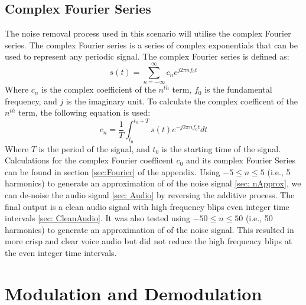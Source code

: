 \documentclass{article}
\begin{document}
\subsection{Complex Fourier Series}
The noise removal process used in this scenario will utilise the complex Fourier series. The complex Fourier series is a series of complex exponentials that can be used to represent any periodic signal. The complex Fourier series is defined as:
\begin{equation}
    s(t) = \sum_{n=-\infty}^{\infty} c_n e^{j2 \pi nf_{0}t}
\end{equation}
Where $c_n$ is the complex coefficient of the $n^{th}$ term, $f_{0}$ is the fundamental frequency, and $j$ is the imaginary unit. To calculate the complex coefficent of the $n^{th}$ term, the following equation is used:
\begin{equation}
    c_n = \frac{1}{T} \int_{t_{0}}^{t_{0}+T} s(t) e^{-j2 \pi nf_{0}t} dt
\end{equation}
Where $T$ is the period of the signal, and $t_{0}$ is the starting time of the signal. Calculations for the complex Fourier coefficent $c_{0}$ and its complex Fourier Series can be found in section \ref{sec:Fourier} of the appendix. Using $-5 \leq n \leq 5$ (i.e., 5 harmonics) to generate an approximation of of the noise signal \ref{sec: nApprox}, we can de-noise the audio signal \ref{sec: Audio} by reversing the additive process. The final output is a clean audio signal with high frequency blips even integer time intervals \ref{sec: CleanAudio}. It was also tested using $-50 \leq n \leq 50$ (i.e., 50 harmonics) to generate an approximation of of the noise signal. This resulted in more crisp and clear voice audio but did not reduce the high frequency blips at the even integer time intervals.

\section{Modulation and Demodulation}
\end{document}
